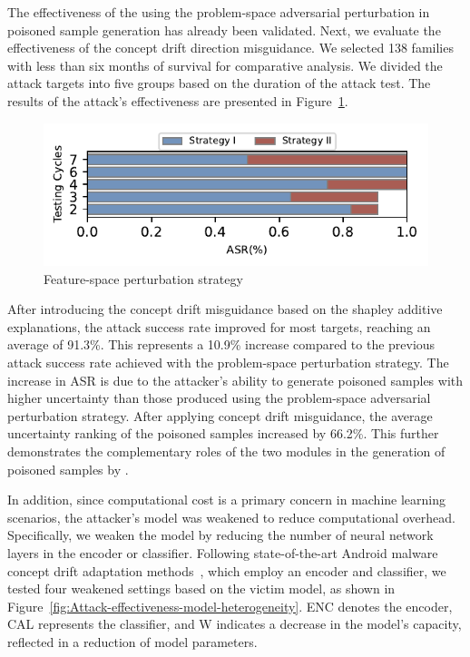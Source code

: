 The effectiveness of the \pandora using the problem-space adversarial perturbation in poisoned sample generation has already been validated. 
Next, we evaluate the effectiveness of the concept drift direction misguidance.
We selected 138 families with less than six months of survival for comparative analysis. 
We divided the attack targets into five groups based on the duration of the attack test.
The results of the attack’s effectiveness are presented in Figure~\ref{fig:feature-space perturbation strategy}.
\begin{figure}[h!]
	\centering
	\includegraphics[width=\linewidth,keepaspectratio]{Graph/Evaluation/Figure26.pdf}
	\caption{Feature-space perturbation strategy}
	\label{fig:feature-space perturbation strategy}
\end{figure}
After introducing the concept drift misguidance based on the shapley additive explanations, the attack success rate improved for most targets, reaching an average of 91.3\%.
This represents a 10.9\% increase compared to the previous attack success rate achieved with the problem-space perturbation strategy.
The increase in ASR is due to the attacker’s ability to generate poisoned samples with higher uncertainty than those produced using the problem-space adversarial perturbation strategy.
After applying concept drift misguidance, the average uncertainty ranking of the poisoned samples increased by 66.2\%.
This further demonstrates the complementary roles of the two modules in the generation of poisoned samples by \pandora.

In addition, since computational cost is a primary concern in machine learning scenarios, the attacker’s model was weakened to reduce computational overhead.
Specifically, we weaken the model by reducing the number of neural network layers in the encoder or classifier.
Following state-of-the-art Android malware concept drift adaptation methods~\cite{2023-Usenix-chenyizhen}, which employ an encoder and classifier, we tested four weakened settings based on the victim model, as shown in Figure~\ref{fig:Attack-effectiveness-model-heterogeneity}.
ENC denotes the encoder, CAL represents the classifier, and W indicates a decrease in the model’s capacity, reflected in a reduction of model parameters.

